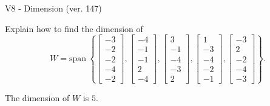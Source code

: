 \begin{exercise}
  \begin{exerciseTitle}V8 - Dimension (ver. 147)\end{exerciseTitle}
  \begin{exerciseStatement}
    Explain how to find the dimension of 
\[W=\mathrm{span}\ \left\{\left[\begin{array}{r}
-3 \\
-2 \\
-2 \\
-4 \\
-2
\end{array}\right] , \left[\begin{array}{r}
-4 \\
-1 \\
-1 \\
2 \\
-4
\end{array}\right] , \left[\begin{array}{r}
3 \\
-1 \\
-4 \\
-3 \\
2
\end{array}\right] , \left[\begin{array}{r}
1 \\
-3 \\
-4 \\
-2 \\
-1
\end{array}\right] , \left[\begin{array}{r}
-3 \\
2 \\
-2 \\
-4 \\
-3
\end{array}\right]\right\}.\]



  \end{exerciseStatement}
  \begin{exerciseAnswer}
   The dimension of \(W\) is  \(5\).
  


  \end{exerciseAnswer}
\end{exercise}